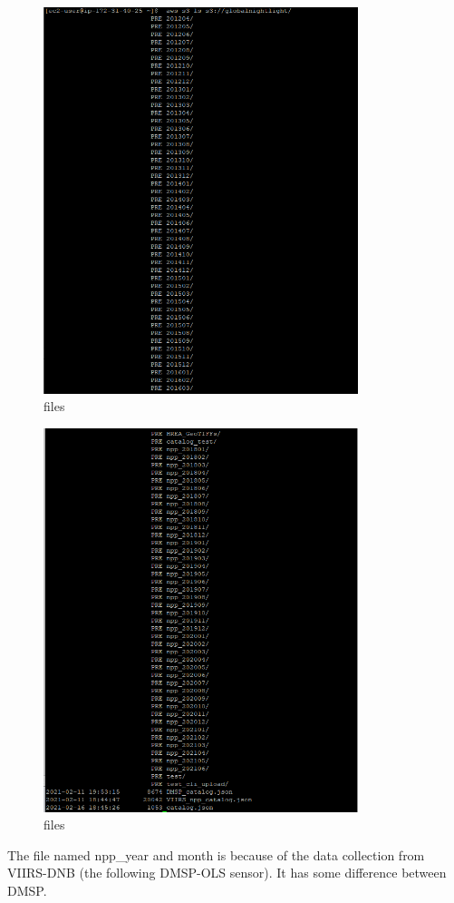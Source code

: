 \documentclass[conference]{IEEEtran}
\begin{document}
\begin{figure}[htbp]
    \centerline{\includegraphics[width=260pt]{images/3.1.png}}
    \caption{files}
    \label{satellite2}
\end{figure}

\begin{figure}[htbp]
    \centerline{\includegraphics[width=260pt]{images/3.2.png}}
    \caption{files}
    \label{satellite}
\end{figure}

The file named npp\_year and month is because of the data collection from VIIRS-DNB (the following DMSP-OLS sensor). 
It has some difference between DMSP.
\end{document}
